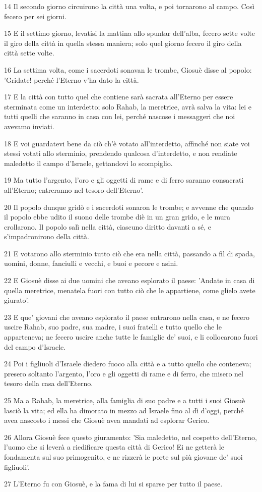 \par 14 Il secondo giorno circuirono la città una volta, e poi tornarono al campo. Così fecero per sei giorni.
\par 15 E il settimo giorno, levatisi la mattina allo spuntar dell'alba, fecero sette volte il giro della città in quella stessa maniera; solo quel giorno fecero il giro della città sette volte.
\par 16 La settima volta, come i sacerdoti sonavan le trombe, Giosuè disse al popolo: 'Gridate! perché l'Eterno v'ha dato la città.
\par 17 E la città con tutto quel che contiene sarà sacrata all'Eterno per essere sterminata come un interdetto; solo Rahab, la meretrice, avrà salva la vita: lei e tutti quelli che saranno in casa con lei, perché nascose i messaggeri che noi avevamo inviati.
\par 18 E voi guardatevi bene da ciò ch'è votato all'interdetto, affinché non siate voi stessi votati allo sterminio, prendendo qualcosa d'interdetto, e non rendiate maledetto il campo d'Israele, gettandovi lo scompiglio.
\par 19 Ma tutto l'argento, l'oro e gli oggetti di rame e di ferro saranno consacrati all'Eterno; entreranno nel tesoro dell'Eterno'.
\par 20 Il popolo dunque gridò e i sacerdoti sonaron le trombe; e avvenne che quando il popolo ebbe udito il suono delle trombe diè in un gran grido, e le mura crollarono. Il popolo salì nella città, ciascuno diritto davanti a sé, e s'impadronirono della città.
\par 21 E votarono allo sterminio tutto ciò che era nella città, passando a fil di spada, uomini, donne, fanciulli e vecchi, e buoi e pecore e asini.
\par 22 E Giosuè disse ai due uomini che aveano esplorato il paese: 'Andate in casa di quella meretrice, menatela fuori con tutto ciò che le appartiene, come glielo avete giurato'.
\par 23 E que' giovani che aveano esplorato il paese entrarono nella casa, e ne fecero uscire Rahab, suo padre, sua madre, i suoi fratelli e tutto quello che le apparteneva; ne fecero uscire anche tutte le famiglie de' suoi, e li collocarono fuori del campo d'Israele.
\par 24 Poi i figliuoli d'Israele diedero fuoco alla città e a tutto quello che conteneva; presero soltanto l'argento, l'oro e gli oggetti di rame e di ferro, che misero nel tesoro della casa dell'Eterno.
\par 25 Ma a Rahab, la meretrice, alla famiglia di suo padre e a tutti i suoi Giosuè lasciò la vita; ed ella ha dimorato in mezzo ad Israele fino al dì d'oggi, perché avea nascosto i messi che Giosuè avea mandati ad esplorar Gerico.
\par 26 Allora Giosuè fece questo giuramento: 'Sia maledetto, nel cospetto dell'Eterno, l'uomo che si leverà a riedificare questa città di Gerico! Ei ne getterà le fondamenta sul suo primogenito, e ne rizzerà le porte sul più giovane de' suoi figliuoli'.
\par 27 L'Eterno fu con Giosuè, e la fama di lui si sparse per tutto il paese.

